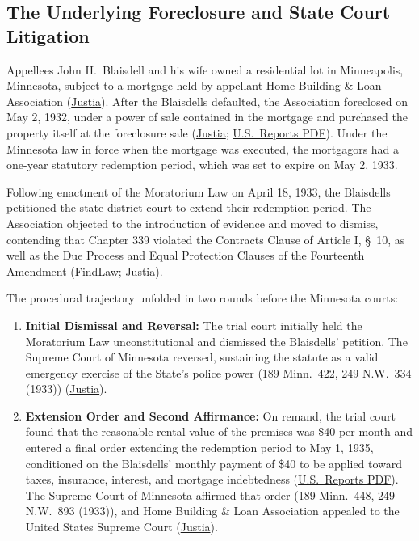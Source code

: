 \documentclass[12pt]{article}
\begin{document}
\subsection{The Underlying Foreclosure and State Court Litigation}
Appellees John H.\ Blaisdell and his wife owned a residential lot in Minneapolis, Minnesota, subject to a mortgage held by appellant Home Building \& Loan Association (\href{https://supreme.justia.com/cases/federal/us/290/398/}{Justia}). After the Blaisdells defaulted, the Association foreclosed on May 2, 1932, under a power of sale contained in the mortgage and purchased the property itself at the foreclosure sale (\href{https://supreme.justia.com/cases/federal/us/290/398/}{Justia}; \href{https://tile.loc.gov/storage-services/service/ll/usrep/usrep290/usrep290398/usrep290398.pdf}{U.S.\ Reports PDF}). Under the Minnesota law in force when the mortgage was executed, the mortgagors had a one-year statutory redemption period, which was set to expire on May 2, 1933.

Following enactment of the Moratorium Law on April 18, 1933, the Blaisdells petitioned the state district court to extend their redemption period. The Association objected to the introduction of evidence and moved to dismiss, contending that Chapter 339 violated the Contracts Clause of Article I, \S\ 10, as well as the Due Process and Equal Protection Clauses of the Fourteenth Amendment (\href{https://caselaw.findlaw.com/court/us-supreme-court/290/398.html}{FindLaw}; \href{https://supreme.justia.com/cases/federal/us/290/398/}{Justia}).

The procedural trajectory unfolded in two rounds before the Minnesota courts:
\begin{enumerate}
  \item \textbf{Initial Dismissal and Reversal:} The trial court initially held the Moratorium Law unconstitutional and dismissed the Blaisdells' petition. The Supreme Court of Minnesota reversed, sustaining the statute as a valid emergency exercise of the State's police power (189 Minn.\ 422, 249 N.W.\ 334 (1933)) (\href{https://supreme.justia.com/cases/federal/us/290/398/}{Justia}).
  \item \textbf{Extension Order and Second Affirmance:} On remand, the trial court found that the reasonable rental value of the premises was \$40 per month and entered a final order extending the redemption period to May 1, 1935, conditioned on the Blaisdells' monthly payment of \$40 to be applied toward taxes, insurance, interest, and mortgage indebtedness (\href{https://tile.loc.gov/storage-services/service/ll/usrep/usrep290/usrep290398/usrep290398.pdf}{U.S.\ Reports PDF}). The Supreme Court of Minnesota affirmed that order (189 Minn.\ 448, 249 N.W.\ 893 (1933)), and Home Building \& Loan Association appealed to the United States Supreme Court (\href{https://supreme.justia.com/cases/federal/us/290/398/}{Justia}).
\end{enumerate}
\end{document}
